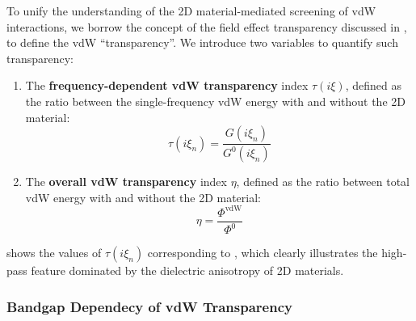 To unify the understanding of the 2D material-mediated screening of
vdW interactions, we borrow the concept of the field effect
transparency  discussed in
, to define the vdW ``transparency''.
%
We introduce two variables to quantify such transparency:
\begin{enumerate}
\item The \textbf{frequency-dependent vdW transparency} index $\tau(i\xi)$,
  defined as the ratio between the single-frequency vdW energy with
  and without the 2D material:
  \begin{equation*}
  \label{eq:vdw-def-tau}
  \tau(i \xi_{n}) = \frac{G(i \xi_{n})}{G^{0}(i\xi_{n})}
\end{equation*}

\item The \textbf{overall vdW transparency} index $\eta$, defined as
  the ratio between total vdW energy with and without the 2D material:
  \begin{equation*}
\label{eq:vdw-def-total-trans}
\eta = \frac{\Phi^{\mathrm{vdW}}}{\Phi^{0}}
\end{equation*}
\end{enumerate}
%
 shows the values of $\tau(i \xi_{n})$
corresponding to , which clearly illustrates the
high-pass feature dominated by the dielectric anisotropy of 2D materials.

\subsubsection{Bandgap Dependecy of vdW Transparency}
\label{sec:bandg-depend-vdw}

